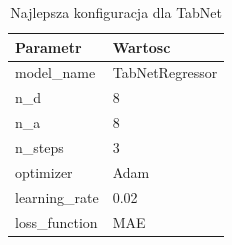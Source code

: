 \begin{table}[h]
\centering
\caption{Najlepsza konfiguracja dla TabNet}
\label{tab:best_config_tabnet}
\begin{tabular}{ll}
\toprule
Parametr & Wartosc \\
\midrule
model\_name & TabNetRegressor \\
n\_d & 8 \\
n\_a & 8 \\
n\_steps & 3 \\
optimizer & Adam \\
learning\_rate & 0.02 \\
loss\_function & MAE \\
\bottomrule
\end{tabular}
\end{table}
